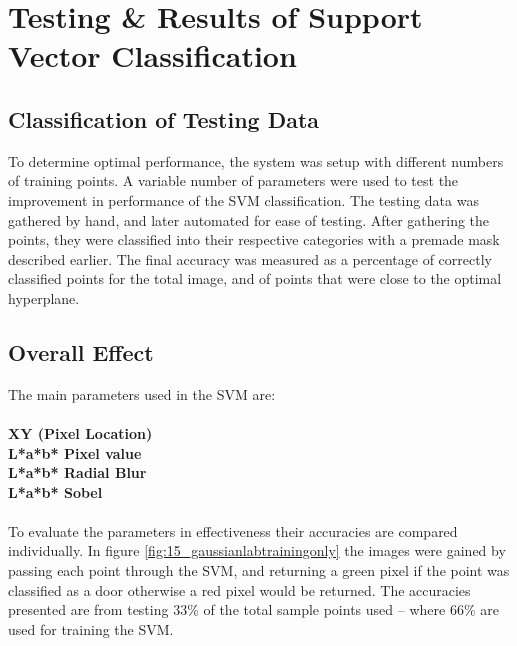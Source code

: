 \chapter {Testing \& Results of Support Vector Classification}

\section{Classification of Testing Data}
To determine optimal performance, the system was setup with different numbers of training points. A variable number of parameters were used to test the improvement in performance of the SVM classification. The testing data was gathered by hand, and later automated for ease of testing. After gathering the points, they were classified into their respective categories with a premade mask described earlier. The final accuracy was measured as a percentage of correctly classified points for the total image, and of points that were close to the optimal hyperplane.
\section{Overall Effect}
The main parameters used in the SVM are:\\ 
\\
\textbf{XY (Pixel Location)}\\
\textbf{L*a*b* Pixel value} \\
\textbf{L*a*b* Radial Blur} \\
\textbf{L*a*b* Sobel} \\
\\
To evaluate the parameters in effectiveness their accuracies are compared individually. In figure \ref{fig:15_gaussianlabtrainingonly} the images were gained by passing each point through the SVM, and returning a green pixel if the point was classified as a door otherwise a red pixel would be returned. The accuracies presented are from testing 33\% of the total sample points used -- where 66\% are used for training the SVM.
\newpage


